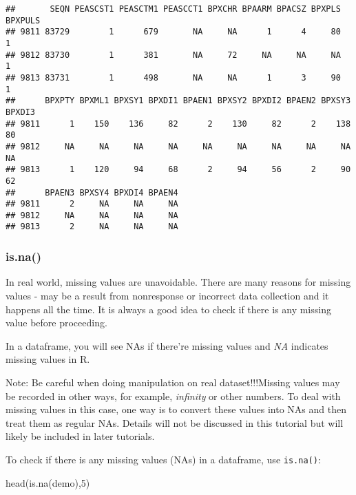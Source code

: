 \documentclass[
]{book}
\newenvironment{Shaded}{\begin{snugshade}}{\end{snugshade}}
\newcommand{\DecValTok}[1]{\textcolor[rgb]{0.00,0.00,0.81}{#1}}
\newcommand{\FunctionTok}[1]{\textcolor[rgb]{0.00,0.00,0.00}{#1}}
\newcommand{\NormalTok}[1]{#1}
\begin{document}
\begin{verbatim}
##       SEQN PEASCST1 PEASCTM1 PEASCCT1 BPXCHR BPAARM BPACSZ BPXPLS BPXPULS
## 9811 83729        1      679       NA     NA      1      4     80       1
## 9812 83730        1      381       NA     72     NA     NA     NA       1
## 9813 83731        1      498       NA     NA      1      3     90       1
##      BPXPTY BPXML1 BPXSY1 BPXDI1 BPAEN1 BPXSY2 BPXDI2 BPAEN2 BPXSY3 BPXDI3
## 9811      1    150    136     82      2    130     82      2    138     80
## 9812     NA     NA     NA     NA     NA     NA     NA     NA     NA     NA
## 9813      1    120     94     68      2     94     56      2     90     62
##      BPAEN3 BPXSY4 BPXDI4 BPAEN4
## 9811      2     NA     NA     NA
## 9812     NA     NA     NA     NA
## 9813      2     NA     NA     NA
\end{verbatim}

\hypertarget{is.na}{%
\subsubsection{is.na()}\label{is.na}}

In real world, missing values are unavoidable. There are many reasons for missing values - may be a result from nonresponse or incorrect data collection and it happens all the time. It is always a good idea to check if there is any missing value before proceeding.

In a dataframe, you will see NAs if there're missing values and \emph{NA} indicates missing values in R.

Note: Be careful when doing manipulation on real dataset!!!Missing values may be recorded in other ways, for example, \emph{infinity} or other numbers. To deal with missing values in this case, one way is to convert these values into NAs and then treat them as regular NAs. Details will not be discussed in this tutorial but will likely be included in later tutorials.

To check if there is any missing values (NAs) in a dataframe, use \texttt{is.na()}:

\begin{Shaded}
\begin{Highlighting}[]
\FunctionTok{head}\NormalTok{(}\FunctionTok{is.na}\NormalTok{(demo),}\DecValTok{5}\NormalTok{)}
\end{Highlighting}
\end{Shaded}
\end{document}
